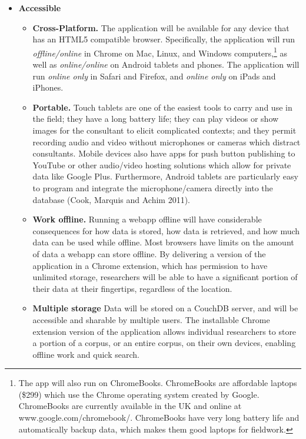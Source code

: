 \documentclass[12 pt]{article}
\begin{document}
\begin{itemize}
\item{\bf Accessible}
\begin{itemize}
\item { \bf Cross-Platform.} The application will be available for any device that has an HTML5 compatible browser. Specifically, the application will run \emph{offline/online} in Chrome  on Mac, Linux, and Windows computers,\footnote{The app will also run on ChromeBooks. ChromeBooks are affordable laptops (\$299) which use the Chrome operating system created by Google. ChromeBooks are currently available in the UK and online at www.google.com/chromebook/. ChromeBooks have very long battery life and automatically backup data, which makes them good laptops for fieldwork.} as well as \emph{online/online} on Android tablets and phones. The application will run \emph{online only} in Safari and Firefox, and \emph{online only }on iPads and iPhones. 
\item  {\bf Portable.} Touch tablets are one of the easiest tools to carry and use in the field; they have a long battery life; they can play videos or show images for the consultant to elicit complicated contexts; and they permit recording audio and video without  microphones or cameras which distract consultants. Mobile devices also have apps for push button  publishing to YouTube or other audio/video hosting solutions  which  allow for private data like Google Plus. Furthermore, Android tablets are particularly easy to program and integrate the microphone/camera directly into the database (Cook, Marquis and Achim 2011).
\item {\bf Work offline.} Running a webapp offline will have considerable consequences for how data is stored, how data is retrieved, and how much data can be used while offline. Most browsers have limits on the amount of data a webapp can store offline. By delivering a version of the application in a Chrome extension, which has permission to have unlimited storage, researchers will be able to have a significant portion of their data at their fingertips, regardless of the location. 
\item {\bf Multiple storage} Data will be stored on a CouchDB server, and will be accessible and sharable by multiple users.  The installable Chrome extension version of the application allows individual researchers to store a portion of a corpus, or an entire corpus, on their own devices, enabling offline work and quick search. 
\end{itemize}




\end{itemize}
\end{document}
